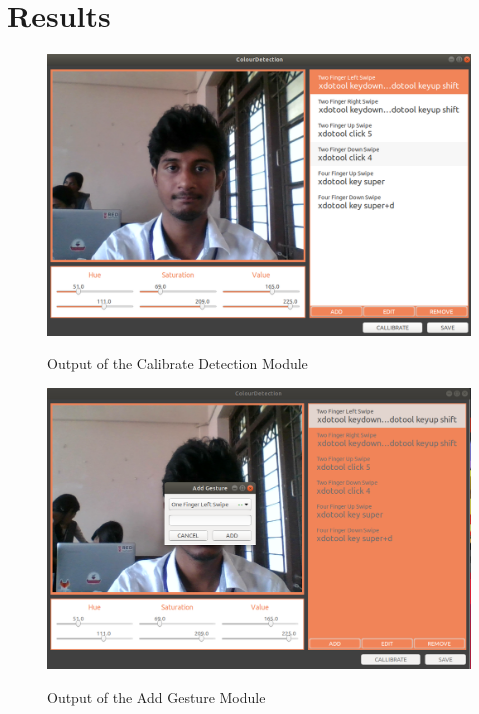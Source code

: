 \documentclass[11pt]{report}
\begin{document}
\chapter{Results}
\begin{figure}[H]
    \includegraphics[width=14cm]{1.png}
    \label{Calibrate Detection}
    \caption{Output of the Calibrate Detection Module}
    \end{figure}

    \begin{figure}[H]
        \includegraphics[width=14cm]{2.png}
        \label{Add Gesture}
        \caption{Output of the Add Gesture Module}
        \end{figure}
\end{document}
